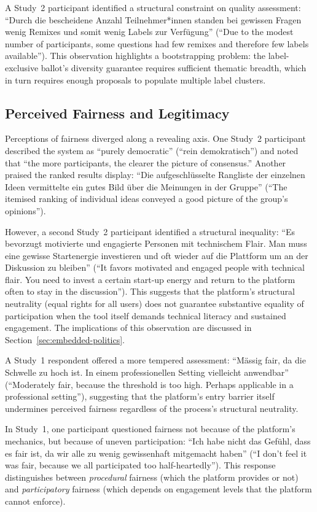 \documentclass[a4paper, 12pt, twoside]{iviathesis}
\begin{document}
A Study~2 participant identified a structural constraint on quality assessment: ``Durch die bescheidene Anzahl Teilnehmer*innen standen bei gewissen Fragen wenig Remixes und somit wenig Labels zur Verf\"ugung'' (``Due to the modest number of participants, some questions had few remixes and therefore few labels available''). This observation highlights a bootstrapping problem: the label-exclusive ballot's diversity guarantee requires sufficient thematic breadth, which in turn requires enough proposals to populate multiple label clusters.

\subsection{Perceived Fairness and Legitimacy}

Perceptions of fairness diverged along a revealing axis. One Study~2 participant described the system as ``purely democratic'' (``rein demokratisch'') and noted that ``the more participants, the clearer the picture of consensus.'' Another praised the ranked results display: ``Die aufgeschl\"usselte Rangliste der einzelnen Ideen vermittelte ein gutes Bild \"uber die Meinungen in der Gruppe'' (``The itemised ranking of individual ideas conveyed a good picture of the group's opinions'').

However, a second Study~2 participant identified a structural inequality: ``Es bevorzugt motivierte und engagierte Personen mit technischem Flair. Man muss eine gewisse Startenergie investieren und oft wieder auf die Plattform um an der Diskussion zu bleiben'' (``It favors motivated and engaged people with technical flair. You need to invest a certain start-up energy and return to the platform often to stay in the discussion''). This suggests that the platform's structural neutrality (equal rights for all users) does not guarantee substantive equality of participation when the tool itself demands technical literacy and sustained engagement. The implications of this observation are discussed in Section~\ref{sec:embedded-politics}.

A Study~1 respondent offered a more tempered assessment: ``Mässig fair, da die Schwelle zu hoch ist. In einem professionellen Setting vielleicht anwendbar'' (``Moderately fair, because the threshold is too high. Perhaps applicable in a professional setting''), suggesting that the platform's entry barrier itself undermines perceived fairness regardless of the process's structural neutrality.

In Study~1, one participant questioned fairness not because of the platform's mechanics, but because of uneven participation: ``Ich habe nicht das Gef\"uhl, dass es fair ist, da wir alle zu wenig gewissenhaft mitgemacht haben'' (``I don't feel it was fair, because we all participated too half-heartedly''). This response distinguishes between \textit{procedural} fairness (which the platform provides or not) and \textit{participatory} fairness (which depends on engagement levels that the platform cannot enforce).
\end{document}

